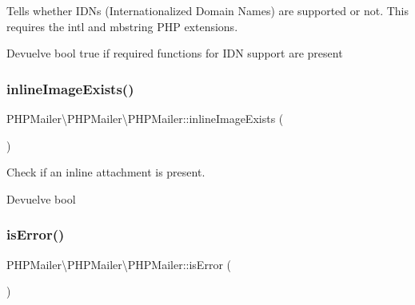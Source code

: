 Tells whether I\+D\+Ns (Internationalized Domain Names) are supported or not. This requires the {\ttfamily intl} and {\ttfamily mbstring} P\+HP extensions.

\begin{DoxyReturn}{Devuelve}
bool {\ttfamily true} if required functions for I\+DN support are present 
\end{DoxyReturn}
\mbox{\label{classPHPMailer_1_1PHPMailer_1_1PHPMailer_a1bfcf7a9b594b407859fe0a8cdc2392a}} 
\subsubsection{\texorpdfstring{inline\+Image\+Exists()}{inlineImageExists()}}
{\footnotesize\ttfamily P\+H\+P\+Mailer\textbackslash{}\+P\+H\+P\+Mailer\textbackslash{}\+P\+H\+P\+Mailer\+::inline\+Image\+Exists (\begin{DoxyParamCaption}{ }\end{DoxyParamCaption})}

Check if an inline attachment is present.

\begin{DoxyReturn}{Devuelve}
bool 
\end{DoxyReturn}
\mbox{\label{classPHPMailer_1_1PHPMailer_1_1PHPMailer_a4f473f38c0b61b399dd1331809c8097f}} 
\subsubsection{\texorpdfstring{is\+Error()}{isError()}}
{\footnotesize\ttfamily P\+H\+P\+Mailer\textbackslash{}\+P\+H\+P\+Mailer\textbackslash{}\+P\+H\+P\+Mailer\+::is\+Error (\begin{DoxyParamCaption}{ }\end{DoxyParamCaption})}

